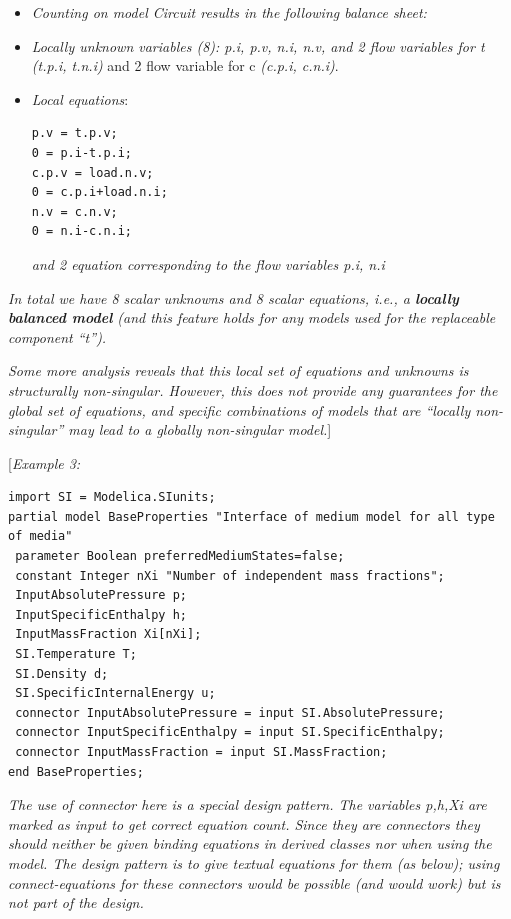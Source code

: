 \documentclass[10pt,a4paper]{report}
\def\Mcommentbegin#1{{[}\emph{#1}}
\def\Mcommentend#1{\emph{#1}{]}}
\def\Mcommentmid#1{\emph{#1}}
\begin{document}
\begin{itemize}
\item \Mcommentmid{Counting on model \emph{Circuit} results in the following balance
sheet:}
\item \Mcommentmid{Locally unknown variables (8): \emph{p.i, p.v, n.i, n.v}, and 2
flow variables for t \emph{(t.p.i, t.n.i)}} and 2 flow variable for c \emph{(c.p.i, c.n.i)}.
\item \Mcommentmid{Local equations}: 
\begin{lstlisting}[language=modelica]
p.v = t.p.v;
0 = p.i-t.p.i;
c.p.v = load.n.v;
0 = c.p.i+load.n.i;
n.v = c.n.v;
0 = n.i-c.n.i;
\end{lstlisting}
\Mcommentmid{and 2 equation corresponding to the flow variables p.i, n.i}
\end{itemize}
\Mcommentmid{In total we have 8 scalar unknowns and 8 scalar equations, i.e., a
\textbf{locally} \textbf{balanced model} (and this feature holds for any
models used for the replaceable component ``t''). }

\Mcommentend{Some more analysis reveals that this local set of equations and
unknowns is structurally non-singular. However, this does not provide
any guarantees for the global set of equations, and specific
combinations of models that are ``locally non-singular'' may lead to a
globally non-singular model.}

\Mcommentbegin{Example 3:}
\begin{lstlisting}[language=modelica]
import SI = Modelica.SIunits;
partial model BaseProperties "Interface of medium model for all type of media"
 parameter Boolean preferredMediumStates=false;
 constant Integer nXi "Number of independent mass fractions";
 InputAbsolutePressure p;
 InputSpecificEnthalpy h;
 InputMassFraction Xi[nXi];
 SI.Temperature T;
 SI.Density d;
 SI.SpecificInternalEnergy u;
 connector InputAbsolutePressure = input SI.AbsolutePressure;
 connector InputSpecificEnthalpy = input SI.SpecificEnthalpy;
 connector InputMassFraction = input SI.MassFraction;
end BaseProperties;
\end{lstlisting}

\Mcommentmid{The use of connector here is a special design pattern. The
variables \emph{p},\emph{h},\emph{Xi} are marked as input to get
correct equation count. Since they are connectors they should neither be
given binding equations in derived classes nor when using the model. The
design pattern is to give textual equations for them (as below); using
connect-equations for these connectors would be possible (and would
work) but is not part of the design.}
\end{document}
